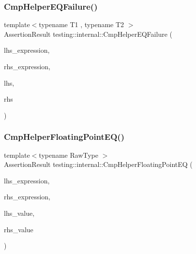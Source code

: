 \mbox{\label{namespacetesting_1_1internal_a1def8ec9393360a1b34a20528703e7f7}} 
\subsubsection{\texorpdfstring{Cmp\+Helper\+E\+Q\+Failure()}{CmpHelperEQFailure()}}
{\footnotesize\ttfamily template$<$typename T1 , typename T2 $>$ \\
Assertion\+Result testing\+::internal\+::\+Cmp\+Helper\+E\+Q\+Failure (\begin{DoxyParamCaption}\item[{const char $\ast$}]{lhs\+\_\+expression,  }\item[{const char $\ast$}]{rhs\+\_\+expression,  }\item[{const T1 \&}]{lhs,  }\item[{const T2 \&}]{rhs }\end{DoxyParamCaption})}

\mbox{\label{namespacetesting_1_1internal_a98ce463e5dbe0c6120fa817e1f8f2944}} 
\subsubsection{\texorpdfstring{Cmp\+Helper\+Floating\+Point\+E\+Q()}{CmpHelperFloatingPointEQ()}}
{\footnotesize\ttfamily template$<$typename Raw\+Type $>$ \\
Assertion\+Result testing\+::internal\+::\+Cmp\+Helper\+Floating\+Point\+EQ (\begin{DoxyParamCaption}\item[{const char $\ast$}]{lhs\+\_\+expression,  }\item[{const char $\ast$}]{rhs\+\_\+expression,  }\item[{Raw\+Type}]{lhs\+\_\+value,  }\item[{Raw\+Type}]{rhs\+\_\+value }\end{DoxyParamCaption})}

